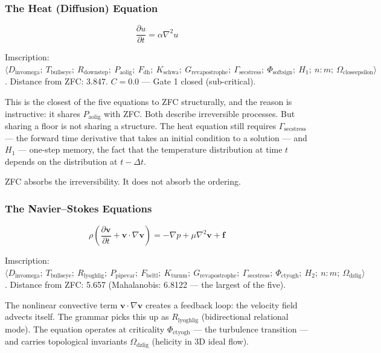\documentclass[12pt,a4paper]{article}
\begin{document}
\subsubsection{The Heat (Diffusion) Equation}

\[\frac{\partial u}{\partial t} = \alpha\nabla^2 u\]

Imscription: $\langle D_{\text{invomega}};\ T_{\text{bullseye}};\ R_{\text{downstep}};\ P_{\text{aolig}};\ F_{\text{dh}};\ K_{\text{schwa}};\ G_{\text{revapostrophe}};\ \Gamma_{\text{secstress}};\ \Phi_{\text{softsign}};\ H_1;\ n{:}m;\ \Omega_{\text{closeepsilon}} \rangle$. Distance from ZFC: 3.847. $C = 0.0$ --- Gate 1 closed (sub-critical).

This is the closest of the five equations to ZFC structurally, and the reason is instructive: it shares $P_{\text{aolig}}$ with ZFC. Both describe irreversible processes. But sharing a floor is not sharing a structure. The heat equation still requires $\Gamma_{\text{secstress}}$ --- the forward time derivative that takes an initial condition to a solution --- and $H_1$ --- one-step memory, the fact that the temperature distribution at time $t$ depends on the distribution at $t - \Delta t$.

ZFC absorbs the irreversibility. It does not absorb the ordering.

\subsubsection{The Navier--Stokes Equations}

\[\rho\left(\frac{\partial\mathbf{v}}{\partial t} + \mathbf{v}\cdot\nabla\mathbf{v}\right) = -\nabla p + \mu\nabla^2\mathbf{v} + \mathbf{f}\]

Imscription: $\langle D_{\text{invomega}};\ T_{\text{bullseye}};\ R_{\text{lyoghlig}};\ P_{\text{pipevar}};\ F_{\text{beltl}};\ K_{\text{turnm}};\ G_{\text{revapostrophe}};\ \Gamma_{\text{secstress}};\ \Phi_{\text{ctyogh}};\ H_2;\ n{:}m;\ \Omega_{\text{dzlig}} \rangle$. Distance from ZFC: 5.657 (Mahalanobis: 6.8122 --- the largest of the five).

The nonlinear convective term $\mathbf{v}\cdot\nabla\mathbf{v}$ creates a feedback loop: the velocity field advects itself. The grammar picks this up as $R_{\text{lyoghlig}}$ (bidirectional relational mode). The equation operates at criticality $\Phi_{\text{ctyogh}}$ --- the turbulence transition --- and carries topological invariants $\Omega_{\text{dzlig}}$ (helicity in 3D ideal flow).
\end{document}
